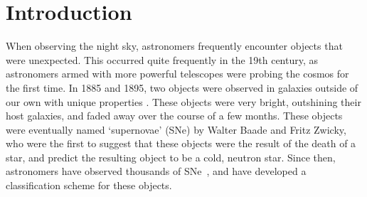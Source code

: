 \chapter{Introduction}
\label{chap:introduction}

% 


When observing the night sky, astronomers frequently encounter objects that 
were unexpected. This occurred quite frequently in the 19th century, as astronomers 
armed with more powerful telescopes were probing the cosmos for the first time. 
In 1885 and 1895, two objects were observed in galaxies outside of our own with unique 
properties \parencite{deVaucouleurs1985, Schaefer1995}. These objects were very 
bright, outshining their host galaxies, and faded away over the course of a few months.
These objects were eventually named `supernovae' (SNe) by Walter Baade and Fritz Zwicky, who were the first to suggest that
these objects were the result of the death of a star, and predict the resulting 
object to be a cold, neutron star\parencite{Baade1934}. Since then, astronomers 
have observed thousands of SNe~\parencite{Barbon1999}, and have
developed a classification scheme for these objects.  

